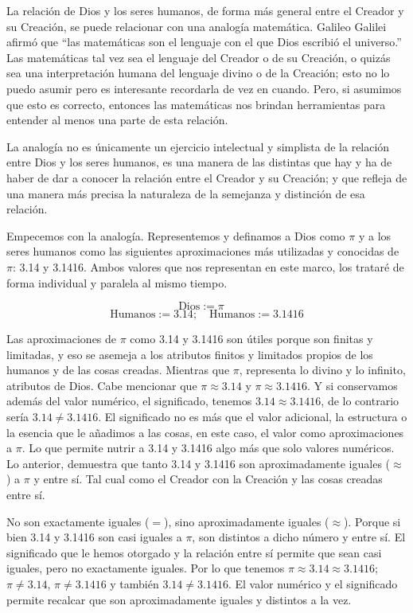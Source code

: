 \documentclass[letterpaper,13pt]{article}
\begin{document}
La relación de Dios y los seres humanos, de forma más general entre el Creador y su Creación, se puede relacionar con una analogía matemática. Galileo Galilei afirmó que ``las matemáticas son el lenguaje con el que Dios escribió el universo.'' Las matemáticas tal vez sea el lenguaje del Creador o de su Creación, o quizás sea una interpretación humana del lenguaje divino o de la Creación; esto no lo puedo asumir pero es interesante recordarla de vez en cuando. Pero, si asumimos que esto es correcto, entonces las matemáticas nos brindan herramientas para entender al menos una parte de esta relación.

La analogía no es únicamente un ejercicio intelectual y simplista de la relación entre Dios y los seres humanos, es una manera de las distintas que hay y ha de haber de dar a conocer la relación entre el Creador y su Creación; y que refleja de una manera más precisa la naturaleza de la semejanza y distinción de esa relación.

Empecemos con la analogía. Representemos y definamos a Dios como $\pi$ y a los seres humanos como las siguientes aproximaciones más utilizadas y conocidas de $\pi$: 3.14 y 3.1416. Ambos valores que nos representan en este marco, los trataré de forma individual y paralela al mismo tiempo.

\[
\text{Dios} := \pi \quad
\]
\[
\text{Humanos} := 3.14; \quad \text{Humanos} := 3.1416
\]

Las aproximaciones de $\pi$ como 3.14 y 3.1416 son útiles porque son finitas y limitadas, y eso se asemeja a los atributos finitos y limitados propios de los humanos y de las cosas creadas. Mientras que $\pi$, representa lo divino y lo infinito, atributos de Dios. Cabe mencionar que $\pi \approx 3.14$ y $\pi \approx 3.1416$. Y si conservamos además del valor numérico, el significado, tenemos $3.14 \approx 3.1416$, de lo contrario sería $3.14 \neq 3.1416$. El significado no es más que el valor adicional, la estructura o la esencia que le añadimos a las cosas, en este caso, el valor como aproximaciones a $\pi$. Lo que permite nutrir a 3.14 y 3.1416 algo más que solo valores numéricos. Lo anterior, demuestra que tanto 3.14 y 3.1416 son aproximadamente iguales ($\approx$) a $\pi$ y entre sí. Tal cual como el Creador con la Creación y las cosas creadas entre sí.

No son exactamente iguales ($=$), sino aproximadamente iguales ($\approx$). Porque si bien 3.14 y 3.1416 son casi iguales a $\pi$, son distintos a dicho número y entre sí. El significado que le hemos otorgado y la relación entre sí permite que sean casi iguales, pero no exactamente iguales. Por lo que tenemos $\pi \approx 3.14 \approx 3.1416$; $\pi \neq 3.14$, $\pi \neq 3.1416$ y también $3.14 \neq 3.1416$. El valor numérico y el significado permite recalcar que son aproximadamente iguales y distintos a la vez.
\end{document}

